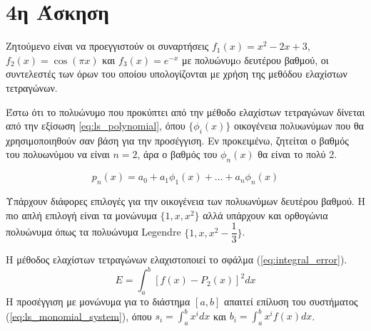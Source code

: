 \documentclass[assignment3.tex]{subfiles}
\begin{document}
\section*{4η Άσκηση}
Ζητούμενο είναι να προεγγιστούν οι συναρτήσεις $f_1(x)=x^2-2x+3$, $f_2(x)=\cos(\pi x)$ και $f_3(x)=e^{-x}$ με πολυώνυμo δευτέρου βαθμού, οι συντελεστές των όρων του οποίου υπολογίζονται με χρήση της μεθόδου ελαχίστων τετραγώνων.

Έστω ότι το πολυώνυμο που προκύπτει από την μέθοδο ελαχίστων τετραγώνων δίνεται από την εξίσωση \ref{eq:ls_polynomial}, όπου $\lbrace\phi_i(x)\rbrace$ οικογένεια πολυωνύμων που θα χρησιμοποιηθούν σαν βάση για την προσέγγιση. Εν προκειμένω, ζητείται ο βαθμός του πολυωνύμου να είναι $n=2$, άρα ο βαθμός του $\phi_n(x)$ θα είναι το πολύ 2.

\begin{equation}
p_n(x) = a_0 + a_1 \phi_1(x) + \dots + a_n \phi_n(x)
\label{eq:ls_polynomial}
\end{equation}

Υπάρχουν διάφορες επιλογές για την οικογένεια των πολυωνύμων δευτέρου βαθμού. Η πιο απλή επιλογή είναι τα μονώνυμα $\lbrace1, x, x^2\rbrace$ αλλά υπάρχουν και ορθογώνια πολυώνυμα όπως τα πολυώνυμα \textlatin{Legendre} $\lbrace1, x, x^2-\dfrac{1}{3}\rbrace$. 

Η μέθοδος ελαχίστων τετραγώνων ελαχιστοποιεί το σφάλμα (\ref{eq:integral_error}).
\begin{equation}
E=\int_{a}^{b} \left[f(x)-P_2(x)\right]^2dx
\label{eq:integral_error}
\end{equation}
Η προσέγγιση με μονώνυμα για το διάστημα $[a,b]$ απαιτεί επίλυση του συστήματος (\ref{eq:ls_monomial_system}), όπου $s_i=\int_{a}^{b}x^idx$ και $b_i=\int_{a}^{b}x^i f(x)dx$. 
\end{document}
